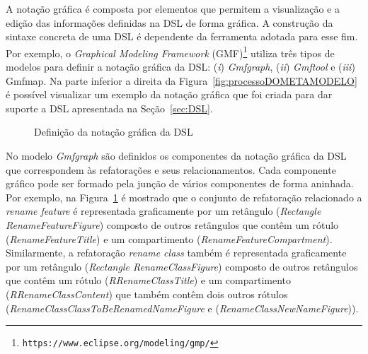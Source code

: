 A notação gráfica é composta por elementos que permitem a visualização e a edição das informações definidas na DSL de forma gráfica. A construção da sintaxe concreta de uma DSL é dependente da ferramenta adotada para esse fim. Por exemplo, o \textit{Graphical Modeling Framework} (GMF)\footnote{\texttt{https://www.eclipse.org/modeling/gmp/}} utiliza três tipos de modelos para definir a notação gráfica da DSL: (\textit{i}) \textit{Gmfgraph}, (\textit{ii}) \textit{Gmftool} e (\textit{iii}) Gmfmap. Na parte inferior a direita da Figura~\ref{fig:processoDOMETAMODELO} é possível visualizar um exemplo da notação gráfica que foi criada para dar suporte a DSL apresentada na Seção~\ref{sec:DSL}. 

\begin{figure}[h!]
 \centering

\caption{Definição da notação gráfica da DSL}
 \label{fig:gmfGraph}
\end{figure}
\FloatBarrier

No modelo \textit{Gmfgraph} são definidos os componentes da notação gráfica da DSL que correspondem às refatorações e seus relacionamentos. Cada componente gráfico pode ser formado pela junção de vários componentes de forma aninhada. Por exemplo, na Figura~\ref{fig:gmfGraph} é mostrado que o conjunto de refatoração relacionado a \textit{rename feature} é representada graficamente por um retângulo (\textit{Rectangle RenameFeatureFigure}) composto de outros retângulos que contêm um rótulo (\textit{RenameFeatureTitle}) e um compartimento (\textit{RenameFeatureCompartment}). Similarmente, a refatoração \textit{rename class} também é representada graficamente por um retângulo (\textit{Rectangle RenameClassFigure}) composto de outros retângulos que contêm um rótulo (\textit{RRenameClassTitle}) e um compartimento (\textit{RRenameClassContent}) que também contêm dois outros rótulos (\textit{RenameClassClassToBeRenamedNameFigure} e (\textit{RenameClassNewNameFigure})). 

